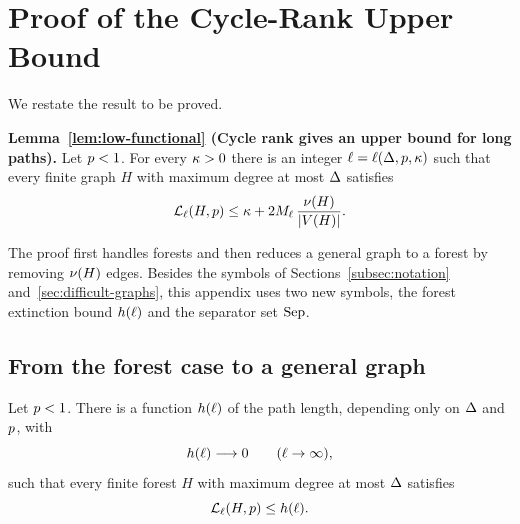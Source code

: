 \section{Proof of the Cycle-Rank Upper Bound}\label{app:low-functional}

We restate the result to be proved.

\medskip
\noindent\textbf{Lemma~\ref{lem:low-functional} (Cycle rank gives an upper
bound for long paths).}
Let \(p<1\). For every \(\kappa>0\) there is an integer
\(\ell=\ell(\Delta,p,\kappa)\) such that every finite graph \(H\) with
maximum degree at most \(\Delta\) satisfies
\[
  \mathcal{L}_{\ell}(H,p)
  \le
  \kappa+2M_{\ell}\,\frac{\nu(H)}{|V(H)|} .
\]

\medskip
The proof first handles forests and then reduces a general graph to a forest
by removing \(\nu(H)\) edges. Besides the symbols of
Sections~\ref{subsec:notation} and~\ref{sec:difficult-graphs}, this appendix
uses two new symbols, the forest extinction bound \(h(\ell)\) and the
separator set \(\mathrm{Sep}\).

\subsection{From the forest case to a general graph}

\begin{lemma}\label{lem:forest-extinction}
Let \(p<1\). There is a function \(h(\ell)\) of the path length,
depending only on \(\Delta\) and \(p\), with
\[
  h(\ell)\longrightarrow0
  \qquad(\ell\to\infty),
\]
such that every finite forest \(H\) with maximum degree at most \(\Delta\)
satisfies
\begin{equation}\label{eq:forest-extinction}
  \mathcal{L}_{\ell}(H,p)\le h(\ell).
\end{equation}
\end{lemma}

